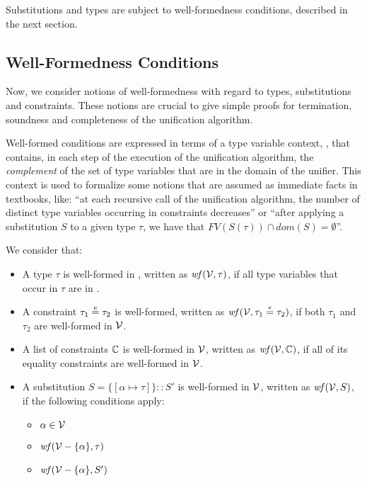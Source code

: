 Substitutions and types are subject to well-formedness conditions,
described in the next section.

\subsection{Well-Formedness Conditions}

Now, we consider notions of well-formedness with regard to types,
substitutions and constraints. These notions are crucial to give
simple proofs for termination, soundness and completeness of the
unification algorithm.

Well-formed conditions are expressed in terms of a type variable
context, \V, that contains, in each step of the execution of the
unification algorithm, the {\em complement\/} of the set of type
variables that are in the domain of the unifier. This context is used
to formalize some notions that are assumed as immediate facts in
textbooks, like: ``at each recursive call of the unification
algorithm, the number of distinct type variables occurring in
constraints decreases'' or ``after applying a substitution $S$ to a
given type $\tau$, we have that $FV(S(\tau)) \cap dom(S) =
\emptyset$''.

We consider that:

\begin{itemize}

  \item A type $\tau$ is well-formed in \V, written as
    $\text{\it wf\/}(\mathcal{V},\tau)$, if all type variables that occur in $\tau$ are
    in \V.

  \item A constraint $\tau_1 \overset{e}{=}
    \tau_2$ is well-formed, written as $\text{\it wf\/}(\mathcal{V},\tau_1 \overset{e}{=} \tau_2)$, if
    both $\tau_1$ and $\tau_2$ are well-formed in $\mathcal{V}$.

  \item A list of constraints $\mathbb{C}$ is well-formed in
    $\mathcal{V}$, written as $\text{\it wf\/}(\mathcal{V},\mathbb{C})$, if all of its equality constraints
    are well-formed in $\mathcal{V}$.

  \item A substitution $S = \{[\alpha\mapsto \tau]\}:: S'$ is well-formed in $\mathcal{V}$,
    written as $\text{\it wf\/}(\mathcal{V},S)$, if the following conditions apply:
     \begin{itemize}
       \item $\alpha\in\mathcal{V}$
       \item $\text{\it wf\/}(\mathcal{V} - \{\alpha\},\tau)$
       \item $\text{\it wf\/}(\mathcal{V}-\{\alpha\},S')$ 
     \end{itemize}
  \end{itemize}

